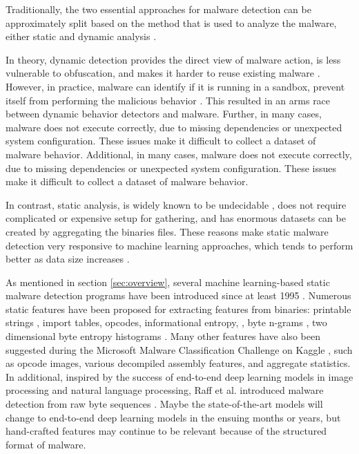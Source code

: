 Traditionally, the two essential approaches for malware detection can be approximately split based on the method that is used to analyze the malware, either static and dynamic analysis \cite{egele2012survey}.

In theory, dynamic detection provides the direct view of malware action, is less vulnerable to obfuscation, and makes it harder to reuse existing malware \cite{moser2007limits}. However, in practice, malware can identify if it is running in a sandbox, prevent itself from performing the malicious behavior \cite{vidas2014evading}. This resulted in an arms race between dynamic behavior detectors and malware. Further, in many cases, malware does not execute correctly, due to missing dependencies or unexpected system configuration. These issues make it difficult to collect a dataset of malware behavior. Additional, in many cases, malware does not execute correctly, due to missing dependencies or unexpected system configuration.  These issues make it difficult to collect a dataset of malware behavior.

In contrast, static analysis, is widely known to be undecidable \cite{cohen1987computer}, does not require complicated or expensive setup for gathering, and has enormous datasets can be created by aggregating the binaries files. These reasons make static malware detection very responsive to machine learning approaches, which tends to perform better as data size increases \cite{banko2001scaling}.

As mentioned in section \ref{sec:overview}, several machine learning-based static malware detection programs have been introduced since at least 1995 \cite{kephart1995biologically}. Numerous static features have been proposed for extracting  features  from  binaries:  printable  strings \cite{schultz2001data}, import tables, opcodes, informational entropy, \cite{weber2002toolkit}, byte n-grams \cite{abou2004n}, two dimensional byte entropy histograms \cite{saxe2015deep}. Many other features have also been suggested during the Microsoft Malware Classification Challenge on Kaggle \cite{ronen2018microsoft}, such as opcode images, various decompiled assembly features, and aggregate statistics. In additional, inspired by the success of end-to-end deep learning models in image processing and natural language processing, Raff et al. introduced malware detection from raw byte sequences \cite{raff2017malware}. Maybe the state-of-the-art models will change to end-to-end deep learning models in the ensuing months or years, but hand-crafted features may continue to be relevant because of the structured format of malware.

